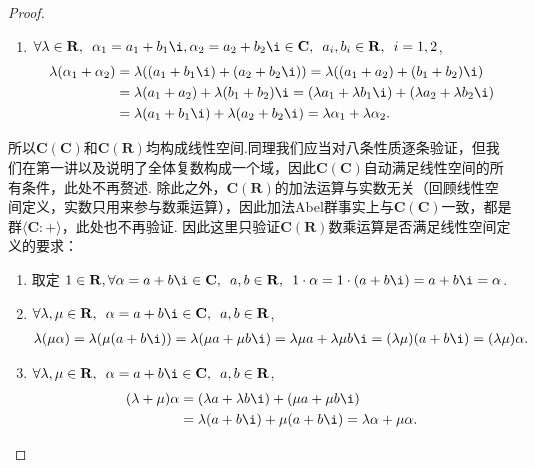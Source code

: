 \begin{proof}
\begin{enumerate}
        \item $\forall \lambda \in \mathbf{R},\enspace \alpha_1 = a_1+b_1\i, \alpha_2 = a_2+b_2\i \in \mathbf{C},\enspace a_i, b_i \in \mathbf{R},\enspace i = 1, 2$,
            \begin{align*}
                \lambda(\alpha_1+\alpha_2)
                    & = \lambda((a_1+b_1\i)+(a_2+b_2\i)) = \lambda((a_1+a_2)+(b_1+b_2)\i)                             \\
                    & = \lambda(a_1+a_2)+\lambda(b_1+b_2)\i = (\lambda a_1+\lambda b_1\i)+(\lambda a_2+\lambda b_2\i) \\
                    & = \lambda(a_1+b_1\i)+\lambda(a_2+b_2\i) = \lambda \alpha_1 + \lambda \alpha_2.
            \end{align*}
    \end{enumerate}
    所以$\mathbf{C}(\mathbf{C})$和$\mathbf{C}(\mathbf{R})$均构成线性空间.同理我们应当对八条性质逐条验证，但我们在第一讲以及说明了全体复数构成一个域，因此$\mathbf{C}(\mathbf{C})$自动满足线性空间的所有条件，此处不再赘述. 除此之外，$\mathbf{C}(\mathbf{R})$的加法运算与实数无关（回顾线性空间定义，实数只用来参与数乘运算），因此加法Abel群事实上与$\mathbf{C}(\mathbf{C})$一致，都是群$\langle \mathbf{C}:+\rangle$，此处也不再验证. 因此这里只验证$\mathbf{C}(\mathbf{R})$数乘运算是否满足线性空间定义的要求：
    \begin{enumerate}
        \item 取定 $1 \in \mathbf{R}, \forall \alpha = a+b\i \in \mathbf{C},\enspace a, b \in \mathbf{R},\enspace 1 \cdot \alpha = 1 \cdot (a+b\i) = a+b\i = \alpha$.

        \item $\forall \lambda, \mu \in \mathbf{R},\enspace \alpha = a+b\i \in \mathbf{C},\enspace a, b \in \mathbf{R}$,
            \begin{align*}
                \lambda(\mu \alpha) = \lambda(\mu (a+b\i)) = \lambda(\mu a+\mu b\i) = \lambda \mu a + \lambda \mu b\i = (\lambda \mu)(a+b\i) = (\lambda \mu)\alpha.
            \end{align*}

        \item $\forall \lambda, \mu \in \mathbf{R},\enspace \alpha = a+b\i \in \mathbf{C},\enspace a, b \in \mathbf{R}$,
            \begin{align*}
                (\lambda + \mu) \alpha
                    & = (\lambda a + \lambda b\i) + (\mu a + \mu b\i)            \\
                    & = \lambda(a+b\i)+\mu(a+b\i) = \lambda \alpha + \mu \alpha.
            \end{align*}


\end{enumerate}
\end{proof}
